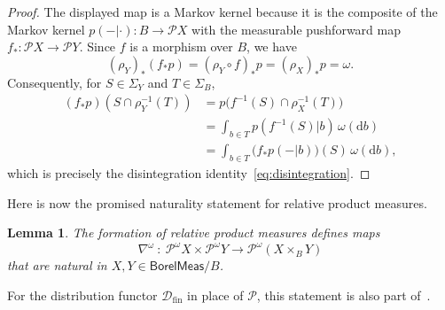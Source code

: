 \documentclass[11pt,a4paper]{scrartcl}
\newcommand{\borelmeas}{\mathsf{BorelMeas}}
\newcommand{\dx}{\mathrm{d}}
\newcommand{\distfin}{\mathcal{D}_{\mathrm{fin}}}
\newcommand{\giry}{\mathcal{P}}
\newtheorem{lem}[theo]{Lemma}
\theoremstyle{definition}
\begin{document}
\begin{proof}
	The displayed map is a Markov kernel because it is the composite of the Markov kernel
	$p(-|\cdot) : B \to \giry X$ with the measurable pushforward map $f_\ast : \giry X \to \giry Y$.
	Since $f$ is a morphism over $B$, we have
	\[
		(\rho_Y)_\ast(f_\ast p)
		= (\rho_Y \circ f)_\ast p
		= (\rho_X)_\ast p
		= \omega.
	\]
	Consequently, for $S \in \Sigma_Y$ and $T \in \Sigma_B$,
	\begin{align*}
		(f_\ast p)(S \cap \rho_Y^{-1}(T))
		&= p\bigl(f^{-1}(S) \cap \rho_X^{-1}(T)\bigr) \\
		&= \int_{b \in T} p(f^{-1}(S)|b) \, \omega(\dx b) \\
		&= \int_{b \in T} \bigl(f_\ast p(-|b)\bigr)(S) \, \omega(\dx b),
	\end{align*}
	which is precisely the disintegration identity~\eqref{eq:disintegration}.
\end{proof}

Here is now the promised naturality statement for relative product measures.

\begin{lem}
	\label{lem:relativeproductnaturality}
	The formation of relative product measures defines maps
	\[
		\nabla^\omega \: : \: \giry^\omega X \times \giry^\omega Y \longrightarrow \giry^\omega(X \times_B Y)
	\]
	that are natural in $X, Y \in \borelmeas/B$.
\end{lem}

For the distribution functor $\distfin$ in place of $\giry$, this statement is also part of~\cite[Proposition~5.2.1]{Flori2016}.
\end{document}
